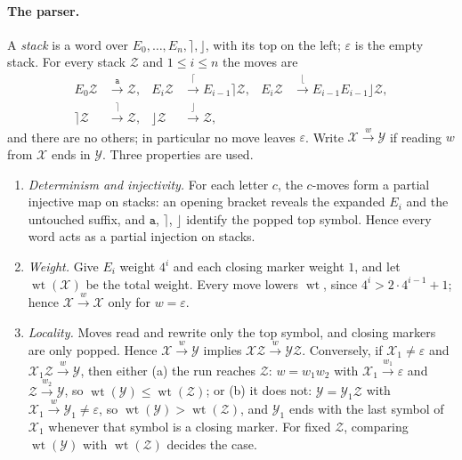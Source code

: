 \documentclass[11pt]{article}
\numberwithin{equation}{section}
\theoremstyle{plain}
\theoremstyle{definition}
\theoremstyle{remark}
\newcommand{\eps}{\varepsilon}
\theoremstyle{plain}
\begin{document}
\paragraph{The parser.}
A \emph{stack} is a word over $E_0,\ldots,E_n,\rceil,\rfloor$, with its
top on the left; $\eps$ is the empty stack. For every stack $\mathcal Z$ and
$1\le i\le n$ the moves are
\[
\begin{aligned}
E_0\mathcal Z&\xrightarrow{\mathtt a}\mathcal Z,&
E_i\mathcal Z&\xrightarrow{\lceil}E_{i-1}\rceil\mathcal Z,&
E_i\mathcal Z&\xrightarrow{\lfloor}E_{i-1}E_{i-1}\rfloor\mathcal Z,\\
\rceil\mathcal Z&\xrightarrow{\rceil}\mathcal Z,&
\rfloor\mathcal Z&\xrightarrow{\rfloor}\mathcal Z,
\end{aligned}
\]
and there are no others; in particular no move leaves $\eps$. Write
$\mathcal X\xrightarrow{w}\mathcal Y$ if reading $w$ from $\mathcal X$ ends in
$\mathcal Y$. Three properties are used.
\begin{enumerate}[label=\textup{(P\arabic*)},leftmargin=2.6em]
\item \emph{Determinism and injectivity.} For each letter $c$, the
$c$-moves form a partial injective map on stacks: an opening bracket
reveals the expanded $E_i$ and the untouched suffix, and $\mathtt a$,
$\rceil$, $\rfloor$ identify the popped top symbol. Hence every word acts
as a partial injection on stacks.
\item \emph{Weight.} Give $E_i$ weight $4^i$ and each closing marker
weight $1$, and let $\operatorname{wt}(\mathcal X)$ be the total weight. Every
move lowers $\operatorname{wt}$, since $4^i>2\cdot4^{i-1}+1$; hence
$\mathcal X\xrightarrow{w}\mathcal X$ only for $w=\eps$.
\item \emph{Locality.} Moves read and rewrite only the top symbol, and
closing markers are only popped. Hence $\mathcal X\xrightarrow{w}\mathcal Y$
implies $\mathcal X\mathcal Z\xrightarrow{w}\mathcal Y\mathcal Z$. Conversely, if
$\mathcal X_1\ne\eps$ and $\mathcal X_1\mathcal Z\xrightarrow{w}\mathcal Y$, then either
\textup{(a)} the run reaches $\mathcal Z$: $w=w_1w_2$ with
$\mathcal X_1\xrightarrow{w_1}\eps$ and $\mathcal Z\xrightarrow{w_2}\mathcal Y$, so
$\operatorname{wt}(\mathcal Y)\le\operatorname{wt}(\mathcal Z)$; or \textup{(b)} it
does not: $\mathcal Y=\mathcal Y_1\mathcal Z$ with $\mathcal X_1\xrightarrow{w}\mathcal Y_1\ne\eps$,
so $\operatorname{wt}(\mathcal Y)>\operatorname{wt}(\mathcal Z)$, and $\mathcal Y_1$
ends with the last symbol of $\mathcal X_1$ whenever that symbol is a closing
marker. For fixed $\mathcal Z$, comparing $\operatorname{wt}(\mathcal Y)$ with
$\operatorname{wt}(\mathcal Z)$ decides the case.
\end{enumerate}
\end{document}
